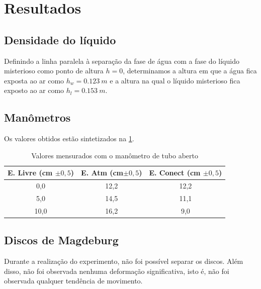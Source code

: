 \section{Resultados}
\subsection{Densidade do líquido}
Definindo a linha paralela à separação da fase de água com a fase do líquido
misterioso como ponto de altura \(h = 0\), determinamos a altura em que a
água fica exposta ao ar como \(h_w = \qty{0,123}{m}\) e a altura na qual o
líquido misterioso fica exposto ao ar como \(h_l = \qty{0,153}{m}\). 

\subsection{Manômetros}
Os valores obtidos estão sintetizados na \cref{tab_man}.

\begin{table}[H]
    \centering
    \begin{tabular}{c | c | c}
        \hline
        \textbf{E. Livre (cm \(\pm 0,5\))} & \textbf{E. Atm (cm\(\pm 0,5\))} &
        \textbf{E. Conect (cm \(\pm0,5\))}\\
        \hline
        0,0 & 12,2 & 12,2\\
        \hline
        5,0 & 14,5 & 11,1\\
        \hline
        10,0 & 16,2 & 9,0\\
        \hline
    \end{tabular}
    \caption{Valores mensurados com o manômetro de tubo aberto}
    \label{tab_man}
\end{table}

\subsection{Discos de Magdeburg}
Durante a realização do experimento, não foi possível separar os discos. Além
disso, não foi observada nenhuma deformação significativa, isto é, não foi
observada qualquer tendência de movimento. 

